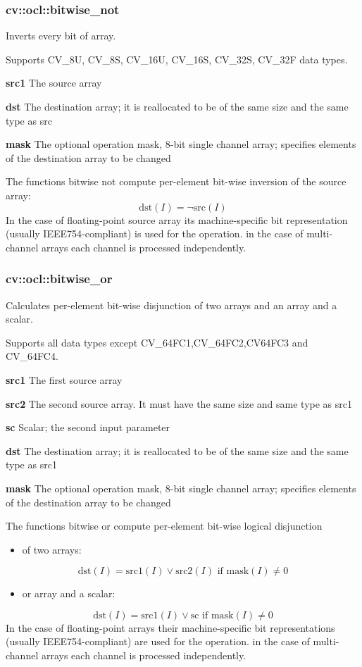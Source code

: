 \documentclass{article}
\begin{document}
\newpage

\subsubsection{cv::ocl::bitwise{\_}not }
\label{subsubsec:mylabel7}
Inverts every bit of array.

Supports CV{\_}8U, CV{\_}8S, CV{\_}16U, CV{\_}16S, CV{\_}32S, CV{\_}32F data
types.

\textbf{src1 }The source array

\textbf{dst }The destination array; it is reallocated to be of the same size
and the same type as src

\textbf{mask }The optional operation mask, 8-bit single channel array;
specifies elements of the destination array to be changed

The functions bitwise not compute per-element bit-wise inversion of the
source array:
\[
\mbox{dst}\left( I \right)=\neg \mbox{src}\left( I \right)
\]
In the case of floating-point source array its machine-specific bit
representation (usually IEEE754-compliant) is used for the operation. in the
case of multi-channel arrays each channel is processed independently.

\newpage

\subsubsection{cv::ocl::bitwise{\_}or }
\label{subsubsec:mylabel8}
Calculates per-element bit-wise disjunction of two arrays and an array and a
scalar.

Supports all data types except CV{\_}64FC1,CV{\_}64FC2,CV64FC3 and
CV{\_}64FC4.

\textbf{src1 }The first source array

\textbf{src2 }The second source array. It must have the same size and same
type as src1

\textbf{sc }Scalar; the second input parameter

\textbf{dst }The destination array; it is reallocated to be of the same size
and the same type as src1

\textbf{mask }The optional operation mask, 8-bit single channel array;
specifies elements of the destination array to be changed

The functions bitwise or compute per-element bit-wise logical disjunction

\begin{itemize}
\item of two arrays:
\end{itemize}
\[
\mbox{dst}\left( I \right)=\mbox{src1}\left( I \right)\vee \mbox{src2}\left(
I \right)\mbox{ if mask}\left( I \right)\ne 0
\]
\begin{itemize}
\item or array and a scalar:
\end{itemize}
\[
\mbox{dst}\left( I \right)=\mbox{src1}\left( I \right)\vee \mbox{sc if
mask}\left( I \right)\ne 0
\]
In the case of floating-point arrays their machine-specific bit
representations (usually IEEE754-compliant) are used for the operation. in
the case of multi-channel arrays each channel is processed independently.
\end{document}
